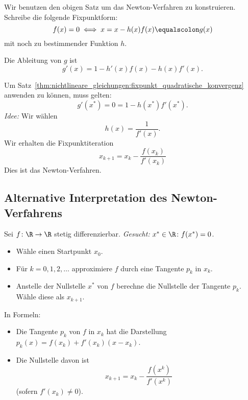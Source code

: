 Wir benutzen den obigen Satz um das Newton-Verfahren zu konstruieren.  Schreibe die folgende
Fixpunktform:
\begin{equation*}
 f(x)=0 \iff x=x-h(x)f(x)\equalscolon g(x)
\end{equation*}
mit noch zu bestimmender Funktion $h$.

Die Ableitung von $g$ ist
\begin{equation*}
 g'(x) = 1-h'(x)f(x) - h(x)f'(x).
\end{equation*}

\medskip

Um Satz~\ref{thm:nichtlineare_gleichungen:fixpunkt_quadratische_konvergenz} anwenden zu können, muss gelten:
\begin{equation*}
 g'(x^*) = 0 = 1 - h(x^*)f'(x^*).
\end{equation*}
\emph{Idee:} Wir wählen
\begin{equation*}
 h(x)=\frac{1}{f'(x)}.
\end{equation*}
Wir erhalten die Fixpunktiteration
\begin{equation*}
 x_{k+1} = x_k-\frac{f(x_k)}{f'(x_k)}
\end{equation*}
Dies ist das Newton-Verfahren.


\subsection{Alternative Interpretation des Newton-Verfahrens}

Sei $f \colon \R \to \R$ stetig differenzierbar. \emph{Gesucht:} $x^* \in \R \colon f(x^*)=0$.


\begin{itemize}
 \item Wähle einen Startpunkt $x_0$.

 \item Für $k=0,1,2,\ldots$ approximiere $f$ durch eine Tangente $p_k$ in $x_k$.

 \item Anstelle der Nullstelle $x^*$ von $f$ berechne die Nullstelle der Tangente $p_k$.
   Wähle diese als $x_{k+1}$.
\end{itemize}

In Formeln:
\begin{itemize}
 \item Die Tangente $p_k$ von $f$ in $x_k$ hat die Darstellung $p_k(x)=f(x_k)+f'(x_k)(x-x_k)$.

 \item Die Nullstelle davon ist
  \begin{equation*}
   x_{k+1} = x_k - \frac{f(x^k)}{f'(x^k)}
  \end{equation*}
 (sofern $f'(x_k) \neq 0$).
\end{itemize}

